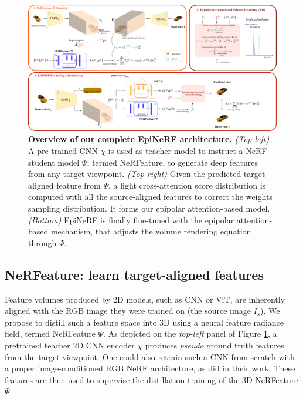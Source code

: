 \begin{figure}[htb!]
    \begin{center}
  \includegraphics[width=\linewidth]{images/epinerf/overview_3DVarchitecture.png}
  \end{center}
  \caption{\textbf{Overview of our complete EpiNeRF architecture.} \textit{(Top left)} A pre-trained \ac{CNN} $\chi$ is used as teacher model to instruct a NeRF student model $\Psi$, termed NeRFeature, to generate deep features from any target viewpoint. \textit{(Top right)} Given the predicted target-aligned feature from $\Psi$, a light cross-attention score distribution is computed with all the source-aligned features to correct the weights sampling distribution. It forms our epipolar attention-based model. \textit{(Bottom)} EpiNeRF is finally fine-tuned with the epipolar attention-based mechanism, that adjusts the volume rendering equation through $\Psi$.}
  \label{fig:overview}
\end{figure}

\subsection{NeRFeature: learn target-aligned features}
\label{subsec:nerfeature}

Feature volumes produced by 2D models, such as \ac{CNN} or \ac{ViT}, are inherently aligned with the RGB image they were trained on (\ie the source image $I_s$). We propose to distill such a feature space into 3D using a neural feature radiance field, termed NeRFeature $\Psi$. As depicted on the \textit{top-left} panel of Figure \ref{fig:overview}, a pretrained teacher 2D \ac{CNN} encoder $\chi$ produces \textit{pseudo} ground truth features from the target viewpoint. One could also retrain such a \ac{CNN} from scratch with a proper image-conditioned RGB \ac{NeRF} architecture, as \citep{yu2021pixelnerf,li2022symmnerf,lin2023vision,jang2021codenerf} did in their work. These features are then used to supervise the distillation training of the 3D NeRFeature $\Psi$. \newline


